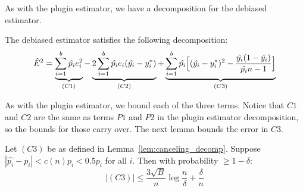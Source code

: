 As with the plugin estimator, we have a decomposition for the debiased estimator.

\begin{lemma}
\label{lem:canceling_decomp}
The debiased estimator satisfies the following decomposition:
\[ \hat{E}^2{} = \underbrace{\sum_{i=1}^b \hat{p_i}e_i^2}_{(C1)}  - \underbrace{2\sum_{i=1}^b \hat{p_i}e_i(\hat{y_i} - y_i^*)}_{(C2)} + \underbrace{\sum_{i=1}^b \hat{p_i}\Big[ (\hat{y_i} - y_i^*)^2 - \frac{\hat{y_i}(1 - \hat{y_i})}{\hat{p_i}n-1} \Big]}_{(C3)} \]
\end{lemma}

As with the plugin estimator, we bound each of the three terms. Notice that $C1$ and $C2$ are the same as terms $P1$ and $P2$ in the plugin estimator decomposition, so the bounds for those carry over. The next lemma bounds the error in $C3$.

\begin{lemma}
\label{lem:c3_bound}
Let $(C3)$ be as defined in Lemma~\ref{lem:canceling_decomp}.
Suppose $|\hat{p_i} - p_i| < c(n) p_i < 0.5 p_i$ for all $i$. Then with probability $\geq 1 - \delta$:
\[ |(C3)| \leq \frac{3\sqrt{B}}{n} \log{\frac{n}{\delta}} + \frac{\delta}{n} \]
\end{lemma}

